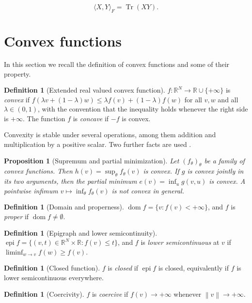 \documentclass[a4paper,11pt]{book}
\theoremstyle{plain}
\newtheorem{proposition}[theorem]{Proposition}
\theoremstyle{definition}
\newtheorem{definition}[theorem]{Definition}
\theoremstyle{remark}
\numberwithin{equation}{chapter}
\numberwithin{algorithm}{chapter}
\newcommand{\R}{\mathbb{R}}
\newcommand{\norm}[1]{\left\|#1\right\|}
\newcommand{\dom}{\operatorname{dom}}
\newcommand{\epi}{\operatorname{epi}}
\begin{document}
	$$
	\langle X,Y\rangle_F=\operatorname{Tr}(XY).
	$$
	
	\section{Convex functions}
	
	In this section we recall the definition of convex functions and some of their property.
	
	\begin{definition}[Extended real valued convex function]
		$f:\R^N\to\R\cup\{+\infty\}$ is \emph{convex} if
		$f(\lambda v+(1-\lambda)w)\leq\lambda f(v)+(1-\lambda)f(w)$ for all $v,w$ and
		all $\lambda\in(0,1)$, with the convention that the inequality holds whenever
		the right side is $+\infty$. The function $f$ is \emph{concave} if $-f$ is
		convex.
	\end{definition}
	
	
	Convexity is stable under several operations, among them addition and
	multiplication by a positive scalar. Two further facts are used .
	
	\begin{proposition}[Supremum and partial minimization]
		Let $(f_\theta)_\theta$ be a family of convex functions. Then
		$h(v)=\sup_\theta f_\theta(v)$ is convex. If $g$ is convex jointly in its two
		arguments, then the partial minimum $e(v)=\inf_u g(v,u)$ is convex. A pointwise
		infimum $v\mapsto\inf_\theta f_\theta(v)$ is not convex in general.
	\end{proposition}
	
	
	
	
	\begin{definition}[Domain and properness]
		$\dom f=\{v:f(v)<+\infty\}$, and $f$ is \emph{proper} if
		$\dom f\neq\emptyset$.
	\end{definition}
	
	\begin{definition}[Epigraph and lower semicontinuity]
		$\epi f=\{(v,t)\in\R^N\times\R:f(v)\leq t\}$, and $f$ is \emph{lower
			semicontinuous} at $v$ if $\liminf_{w\to v}f(w)\geq f(v)$.
	\end{definition}
	
	\begin{definition}[Closed function]
		$f$ is \emph{closed} if $\epi f$ is closed, equivalently if $f$ is lower
		semicontinuous everywhere.
	\end{definition}
	
	\begin{definition}[Coercivity]
		$f$ is \emph{coercive} if $f(v)\to+\infty$ whenever $\norm{v}\to+\infty$.
	\end{definition}
	
\end{document}
